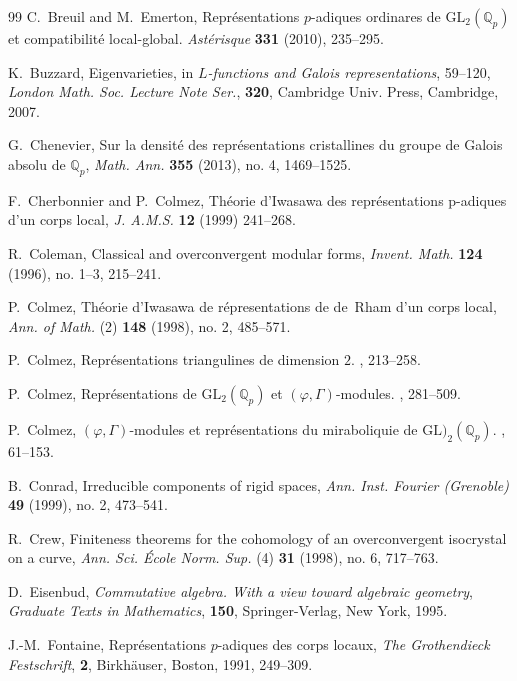 \documentclass[12pt]{article}
\theoremstyle{definition}
\numberwithin{equation}{theorem}
\newcommand{\QQ}{\mathbb{Q}}
\def\Qp{\QQ_p}
\begin{document}
\begin{thebibliography}{99}
C.~Breuil and M.~Emerton,
Repr\'esentations $p$-adiques ordinares de $\mathrm{GL}_2(\Qp)$ et compatibilit\'e local-global.
  \textit{Ast\'erisque} {\bf 331} (2010), 235--295.

K.~Buzzard,
Eigenvarieties, in {\it $L$-functions and Galois representations}, 59--120, {\it London Math. Soc. Lecture Note Ser.}, {\bf 320}, Cambridge Univ. Press, Cambridge, 2007.

 G.~Chenevier, Sur la densit\'e des
  repr\'esentations cristallines du groupe de Galois absolu de $\Qp$,
  \textit{Math. Ann.} {\bf 355} (2013), no. 4, 1469--1525.

F.~Cherbonnier and P.~Colmez,
Th\'eorie d'Iwasawa des repr\'esentations p-adiques d'un corps local, {\it J. A.M.S.} {\bf 12} (1999) 241--268.

R.~Coleman, Classical and overconvergent modular forms, {\it Invent. Math.} {\bf 124} (1996), no. 1--3, 215--241.

 P.~Colmez, Th\'eorie d'Iwasawa de r\'epresentations
  de de~Rham d'un corps local, \textit{Ann. of Math.} (2) {\bf 148}
  (1998), no. 2, 485--571.

 P.~Colmez, Repr\'esentations triangulines de
  dimension $2$.  \cite{R:Ast}, 213--258.

 P.~Colmez,
Repr\'esentations de $\mathrm{GL}_2(\Qp)$ et $(\varphi,\Gamma)$-modules.
\cite{R:Ast2}, 281--509.

 P.~Colmez, $(\varphi,\Gamma)$-modules et
  repr\'esentations du miraboliquie de $\mathrm{GL})_2(\Qp)$.
  \cite{R:Ast2}, 61--153.

B.~Conrad,
Irreducible components of rigid spaces, {\it Ann. Inst. Fourier (Grenoble)} {\bf 49} (1999), no. 2, 473--541.

R.~Crew, Finiteness theorems for the cohomology of an overconvergent isocrystal on a curve, \textit{Ann. Sci. \'Ecole Norm. Sup.} (4) {\bf 31} (1998), no. 6, 717--763. 

D.~Eisenbud, \textit{Commutative algebra. With a view toward algebraic geometry}, \textit{Graduate Texts in Mathematics}, \textbf{150}, Springer-Verlag, New York, 1995.

J.-M.~Fontaine, Repr\'esentations $p$-adiques des corps locaux,
\textit{The Grothendieck Festschrift}, {\bf 2}, Birkh\"auser, Boston,
1991, 249--309.


\end{thebibliography}
\end{document}
